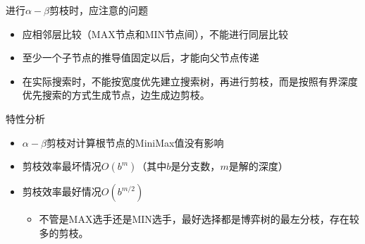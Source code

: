 \begin{note}
    进行$\alpha-\beta$剪枝时，应注意的问题
    \begin{itemize}
        \item 应\textcolor{main1}{相邻层比较}（MAX节点和MIN节点间），不能进行同层比较
        \item 至少一个子节点的推导值\textcolor{main1}{固定以后}，才能向父节点传递
        \item 在实际搜索时，不能按宽度优先建立搜索树，再进行剪枝，而是按照\textcolor{main1}{有界深度优先搜索}的方式生成节点，\textcolor{main1}{边生成边剪枝}。
    \end{itemize}
\end{note}
\begin{note}
    特性分析
    \begin{itemize}
        \item $\alpha-\beta$剪枝对计算根节点的MiniMax值没有影响
        \item 剪枝效率最坏情况$O(b^m)$（其中$b$是分支数，$m$是解的深度）
        \item 剪枝效率最好情况$O(b^{m/2})$
        \begin{itemize}
            \item 不管是MAX选手还是MIN选手，最好选择都是博弈树的最左分枝，存在较多的剪枝。
        \end{itemize}
    \end{itemize}
\end{note}
